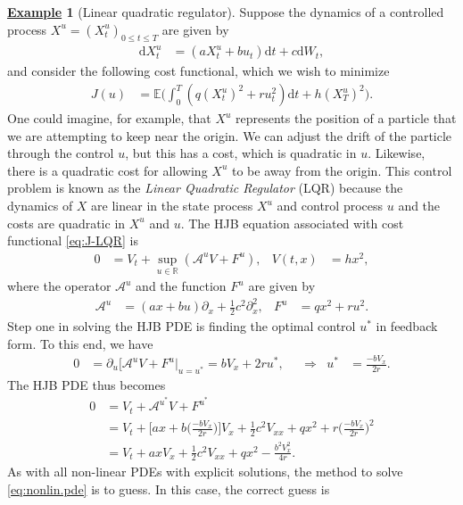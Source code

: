 \documentclass[12pt]{book}
\numberwithin{equation}{chapter}
\theoremstyle{plain}
\numberwithin{theorem}{section}
\theoremstyle{definition}
\newtheorem{example}[theorem]{\underline{Example}}
\numberwithin{exercise}{chapter}
\newcommand{\<}{\langle}
\renewcommand{\>}{\rangle}
\renewcommand{\(}{\left(}
\renewcommand{\)}{\right)}
\renewcommand{\[}{\left[}
\renewcommand{\]}{\right]}
\newcommand\Eb{\mathds{E}}
\newcommand\Rb{\mathds{R}}
\newcommand\Ac{\mathscr{A}}
\renewcommand\d{\partial}
\newcommand\dd{\mathrm{d}}
\begin{document}
\begin{example}[Linear quadratic regulator]
Suppose the dynamics of a controlled process $X^u = (X_t^u)_{0 \leq t \leq T}$ are given by
\begin{align}
\dd X_t^u
	&=	( a X_t^u + b u_t ) \dd t + c \dd W_t ,
\end{align}
and consider the following cost functional, which we wish to minimize
\begin{align}
J(u)
	&=	\Eb \Big( \int_0^T ( q (X_t^u)^2 + r u_t^2 ) \dd t + h (X_T^u)^2 \Big) . \label{eq:J-LQR}
\end{align}
One could imagine, for example, that $X^u$ represents the position of a particle that we are attempting to keep near the origin.  We can adjust the drift of the  particle through the control $u$, but this has a cost, which is quadratic in $u$.  Likewise, there is a quadratic cost for allowing $X^u$ to be away from the origin.  This control problem is known as the \textit{Linear Quadratic Regulator} (LQR) because the dynamics of $X$ are linear in the state process $X^u$ and control process $u$ and the costs are quadratic in $X^u$ and $u$.  The HJB equation associated with cost functional \eqref{eq:J-LQR} is
\begin{align}
0
	&=	V_t + \sup_{u \in \Rb} ( \Ac^u V + F^u ) , &
V(t,x)
	&=	h x^2 ,
\end{align}
where the operator $\Ac^u$ and the function $F^u$ are given by
\begin{align}
\Ac^u
	&=	( a x + b u ) \d_x + \tfrac{1}{2} c^2 \d_x^2 , &
F^u
	&=	q x^2 + r u^2 .
\end{align}
Step one in solving the HJB PDE is finding the optimal control $u^*$ in feedback form.  To this end, we have
\begin{align}
0
	&=	\d_u \Big[ \Ac^u V + F^u \Big|_{u = u^*}  =	b V_x + 2 r u^* , &
	&\Rightarrow&
u^*
	&=	\frac{- b V_x}{2 r }	 .
\end{align}
The HJB PDE thus becomes
\begin{align}
0
	&=	V_t + \Ac^{u^*} V + F^{u^*} \\
	&=	V_t + \Big[ a x + b \Big( \frac{- b V_x}{2 r } \Big) \Big] V_x + \tfrac{1}{2} c^2 V_{xx} + q x^2 + r \Big( \frac{- b V_x}{2 r } \Big)^2 \\
	&=	V_t + a x V_x + \tfrac{1}{2} c^2 V_{xx} + q x^2 - \frac{ b^2 V_x^2}{4 r } . \label{eq:nonlin.pde}
\end{align}
As with all non-linear PDEs with explicit solutions, the method to solve \eqref{eq:nonlin.pde} is to guess.  In this case, the correct guess is

\end{example}
\end{document}
